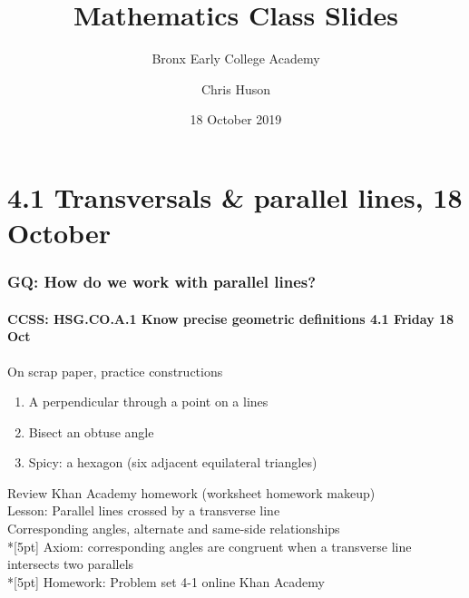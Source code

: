 \documentclass{beamer}
\title{Mathematics Class Slides}
\subtitle{Bronx Early College Academy}
\author{Chris Huson}
\date{18 October 2019}
\begin{document}
\frame{\titlepage}
\section[Outline]{}
\frame{\tableofcontents}


\section{4.1 Transversals \& parallel lines, 18 October}
  \frame
  {
    \frametitle{GQ: How do we work with parallel lines?}
    \framesubtitle{CCSS: HSG.CO.A.1 Know precise geometric definitions \hfill \alert{4.1 Friday 18 Oct}}

    \begin{block}{On scrap paper, practice constructions}
    \begin{enumerate}
      \item A perpendicular through a point on a lines
      \item Bisect an obtuse angle
      \item Spicy: a hexagon (six adjacent equilateral triangles)
    \end{enumerate}
    \end{block}
    Review Khan Academy homework (worksheet homework makeup)\\
    Lesson: Parallel lines crossed by a transverse line \\
    Corresponding angles, alternate and same-side relationships \\*[5pt]
    Axiom: corresponding angles are congruent when a transverse line intersects two parallels\\*[5pt]
    Homework: Problem set 4-1 online Khan Academy
  }
\end{document}
